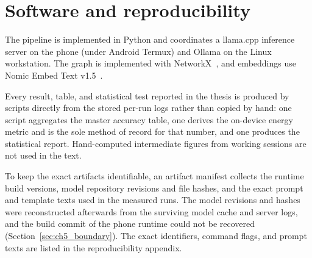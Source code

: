 \section{Software and reproducibility}
\label{sec:repro}

The pipeline is implemented in Python and coordinates a llama.cpp inference server on the phone
(under Android Termux) and Ollama on the Linux workstation. The graph is implemented with
NetworkX~\citep{networkx}, and embeddings use Nomic Embed Text v1.5~\citep{nomic_embed}.

Every result, table, and statistical test reported in the thesis is produced by scripts directly from
the stored per-run logs rather than copied by hand: one script aggregates the master accuracy table,
one derives the on-device energy metric and is the sole method of record for that number, and one
produces the statistical report. Hand-computed intermediate figures from working sessions are not
used in the text.

To keep the exact artifacts identifiable, an artifact manifest collects the runtime build versions,
model repository revisions and file hashes, and the exact prompt and template texts used in the
measured runs. The model revisions and hashes were reconstructed afterwards from the surviving model
cache and server logs, and the build commit of the phone runtime could not be recovered
(Section~\ref{sec:ch5_boundary}). The exact identifiers, command flags, and prompt texts are listed
in the reproducibility appendix.
